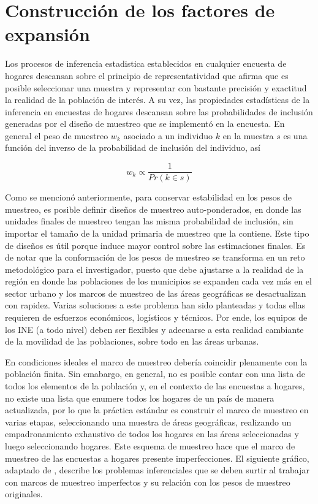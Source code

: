 \documentclass[
  10pt,
  spanish,
]{book}
\begin{document}
\hypertarget{construcciuxf3n-de-los-factores-de-expansiuxf3n}{%
\chapter{Construcción de los factores de expansión}\label{construcciuxf3n-de-los-factores-de-expansiuxf3n}}

Los procesos de inferencia estadistica establecidos en cualquier encuesta de hogares descansan sobre el principio de representatividad que afirma que es posible seleccionar una muestra y representar con bastante precisión y exactitud la realidad de la población de interés. A su vez, las propiedades estadísticas de la inferencia en encuestas de hogares descansan sobre las probabilidades de inclusión generadas por el diseño de muestreo que se implementó en la encuesta. En general el peso de muestreo \(w_k\) asociado a un individuo \(k\) en la muestra \(s\) es una función del inverso de la probabilidad de inclusión del individuo, así

\[
w_k \propto \frac{1}{Pr(k\in s)}
\]

Como se mencionó anteriormente, para conservar estabilidad en los pesos de muestreo, es posible definir diseños de muestreo auto-ponderados, en donde las unidades finales de muestreo tengan las misma probabilidad de inclusión, sin importar el tamaño de la unidad primaria de muestreo que la contiene. Este tipo de diseños es útil porque induce mayor control sobre las estimaciones finales. Es de notar que la conformación de los pesos de muestreo se transforma en un reto metodológico para el investigador, puesto que debe ajustarse a la realidad de la región en donde las poblaciones de los municipios se expanden cada vez más en el sector urbano y los marcos de muestreo de las áreas geográficas se desactualizan con rapidez. Varias soluciones a este problema han sido planteadas \citep{Gambino_Silva_2009} y todas ellas requieren de esfuerzos económicos, logísticos y técnicos. Por ende, los equipos de los INE (a todo nivel) deben ser flexibles y adecuarse a esta realidad cambiante de la movilidad de las poblaciones, sobre todo en las áreas urbanas.

En condiciones ideales el marco de muestreo debería coincidir plenamente con la población finita. Sin emabargo, en general, no es posible contar con una lista de todos los elementos de la población y, en el contexto de las encuestas a hogares, no existe una lista que enumere todos los hogares de un país de manera actualizada, por lo que la práctica estándar es construir el marco de muestreo en varias etapas, seleccionando una muestra de áreas geográficas, realizando un empadronamiento exhaustivo de todos los hogares en las áreas seleccionadas y luego seleccionando hogares. Este esquema de muestreo hace que el marco de muestreo de las encuestas a hogares presente imperfecciones. El siguiente gráfico, adaptado de \citet{Valliant_Dever_2017}, describe los problemas inferenciales que se deben surtir al trabajar con marcos de muestreo imperfectos y su relación con los pesos de muestreo originales.
\end{document}
